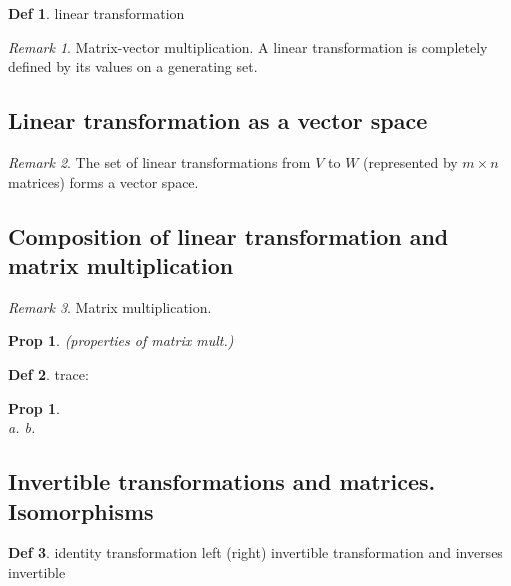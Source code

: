 \documentclass[hidelinks]{article}
\theoremstyle{definition}
\newtheorem*{defin}{Def}
\theoremstyle{plain}
\newtheorem{proposition}[theorem]{Prop}
\theoremstyle{remark}
\newtheorem*{remark}{Remark}
\begin{document}
\begin{defin}
linear transformation
\end{defin}

\begin{remark}
Matrix-vector multiplication. A linear transformation is completely defined by its values on a generating set.
\end{remark}

\subsection{Linear transformation as a vector space}

\begin{remark}
The set of linear transformations from $V$ to $W$ (represented by $m\times n$ matrices) forms a vector space.
\end{remark}

\subsection{Composition of linear transformation and matrix multiplication}

\begin{remark}
Matrix multiplication.
\end{remark}

\begin{proposition} (properties of matrix mult.)

\end{proposition}

\begin{defin}
trace:
\end{defin}

\begin{proposition}~\\
a. \newline
b.
\end{proposition}

\subsection{Invertible transformations and matrices. Isomorphisms}

\begin{defin}
identity transformation \newline
left (right) invertible transformation and inverses \newline
invertible
\end{defin}
\end{document}
